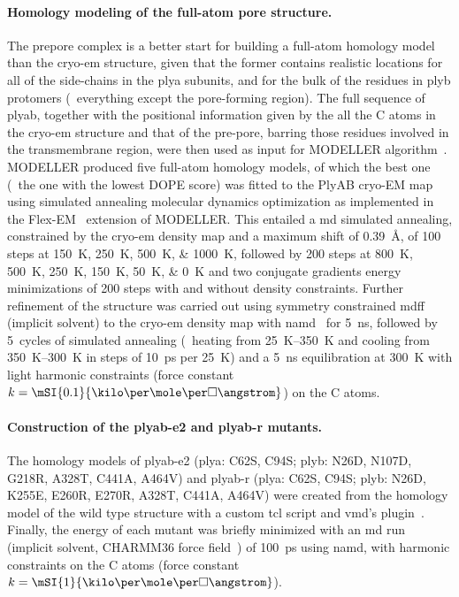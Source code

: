 \paragraph{Homology modeling of the full-atom pore structure.}
%
The prepore complex is a better start for building a full-atom homology model than the \gls{cryo-em}
structure, given that the former contains realistic locations for all of the side-chains in the \gls{plya}
subunits, and for the bulk of the residues in \gls{plyb} protomers (\ie~everything except the pore-forming
region). The full sequence of \gls{plyab}, together with the positional information given by the all the
C\ta{} atoms in the \gls{cryo-em} structure and that of the pre-pore, barring those residues involved in the
transmembrane region, were then used as input for MODELLER  algorithm~\cite{Sali-1993}.
MODELLER produced five full-atom homology models, of which the best one (\ie~the one with the lowest DOPE
score) was fitted to the PlyAB cryo-EM map using simulated annealing molecular dynamics optimization as
implemented in the Flex-EM~\cite{Topf-2008} extension of MODELLER. This entailed a \gls{md} simulated
annealing, constrained by the \gls{cryo-em} density map and a maximum shift of \SI{0.39}{\angstrom}, of 100
steps at \SIlist{150;250;500;1000}{\kelvin}, followed by 200 steps at \SIlist{800;500;250;150;50;0}{\kelvin}
and two conjugate gradients energy minimizations of 200 steps with and without density constraints. Further
refinement of the structure was carried out using symmetry constrained \gls{mdff} (implicit solvent) to the
\gls{cryo-em} density map with \gls{namd}~\cite{Phillips-2005,McGreevy-2014} for \SI{5}{\ns}, followed by
5~cycles of simulated annealing (\ie~heating from \SIrange{25}{350}{\kelvin} and cooling from
\SIrange{350}{300}{\kelvin} in steps of \SI{10}{ps} per \SI{25}{\kelvin}) and a \SI{5}{\ns} equilibration at
\SI{300}{\kelvin} with light harmonic constraints (force constant $k =
\mSI{0.1}{\kilo\cal\per\mole\per\square\angstrom}$) on the C\ta{} atoms.

\paragraph{Construction of the \gls{plyab-e2} and \gls{plyab-r} mutants.}
%
The homology models of \gls{plyab-e2} (\gls{plya}: C62S, C94S; \gls{plyb}: N26D, N107D, G218R, A328T, C441A,
A464V) and \gls{plyab-r} (\gls{plya}: C62S, C94S; \gls{plyb}: N26D, K255E, E260R, E270R, A328T, C441A, A464V)
were created from the homology model of the wild type structure with a custom \gls{tcl} script and \gls{vmd}'s
 plugin~\cite{Humphrey-1996}. Finally, the energy of each mutant was briefly minimized with an
\gls{md} run (implicit solvent, CHARMM36 force field~\cite{Best-2012}) of \SI{100}{\ps} using \gls{namd}, with
harmonic constraints on the C\ta{} atoms (force constant $k =
\mSI{1}{\kilo\cal\per\mole\per\square\angstrom}$).


